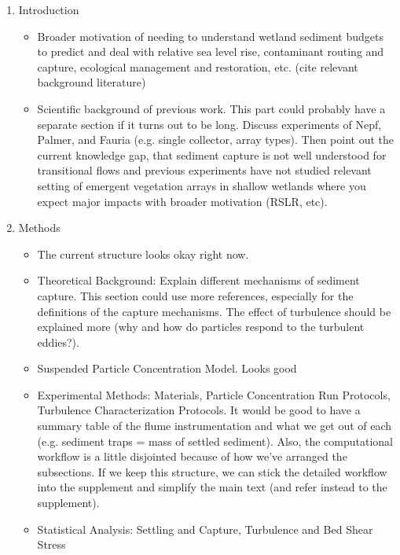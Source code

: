 \documentclass{scrreprt}
\begin{document}
\begin{enumerate}
    \item Introduction
    \begin{itemize}
        \item Broader motivation of needing to understand wetland sediment budgets to predict and deal with relative sea level rise, contaminant routing and capture, ecological management and restoration, etc. (cite relevant background literature)
        \item Scientific background of previous work. This part could probably have a separate section if it turns out to be long. Discuss experiments of Nepf, Palmer, and Fauria (e.g. single collector, array types). Then point out the current knowledge gap, that sediment capture is not well understood for transitional flows and previous experiments have not studied relevant setting of emergent vegetation arrays in shallow wetlands where you expect major impacts with broader motivation (RSLR, etc).
    \end{itemize}
    
    \item Methods
    \begin{itemize}
        \item The current structure looks okay right now.
        \item Theoretical Background: Explain different mechanisms of sediment capture. This section could use more references, especially for the definitions of the capture mechanisms. The effect of turbulence should be explained more (why and how do particles respond to the turbulent eddies?).
        \item Suspended Particle Concentration Model. Looks good
        \item Experimental Methods: Materials, Particle Concentration Run Protocols, Turbulence Characterization Protocols. It would be good to have a summary table of the flume instrumentation and what we get out of each (e.g. sediment traps = mass of settled sediment). Also, the computational workflow is a little disjointed because of how we've arranged the subsections. If we keep this structure, we can stick the detailed workflow into the supplement and simplify the main text (and refer instead to the supplement).
        \item Statistical Analysis: Settling and Capture, Turbulence and Bed Shear Stress
    \end{itemize}
    

\end{enumerate}
\end{document}
